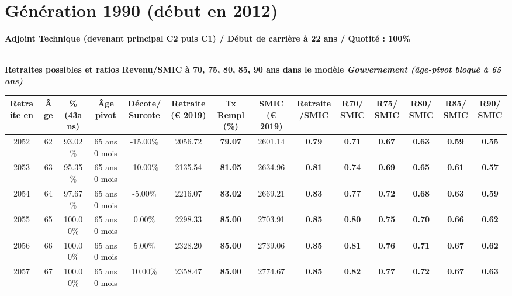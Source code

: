 \newpage 
 
\section{Génération 1990 (début en 2012)\label{AdjTech_100_1990_22_0}} 
 
{\bf \noindent Adjoint Technique (devenant principal C2 puis C1) / Début de carrière à 22 ans / Quotité : 100\%}  ~ 

 ~\\{\bf \noindent Retraites possibles et ratios Revenu/SMIC à 70, 75, 80, 85, 90 ans dans le modèle \emph{Gouvernement (âge-pivot bloqué à 65 ans)}}  
 
\begin{adjustbox}{max width=\textwidth} 
\begin{tabular}[htb]{|c|c||c|c|c||c|c||c|c||c|c|c|c|c|} 
\hline 
 Retraite en &  Âge &  \%(43ans) &  Âge pivot &  Décote/Surcote &  Retraite (\euro{} 2019) &  Tx Rempl(\%) &  SMIC (\euro{} 2019) &  Retraite/SMIC &  R70/SMIC &  R75/SMIC &  R80/SMIC &  R85/SMIC &  R90/SMIC \\ 
\hline \hline 
 2052 &  62 &  93.02\% &  65 ans 0 mois &  -15.00\% &  2056.72 &  {\bf 79.07} &  2601.14 &  {\bf {\color{red} 0.79}} &  {\bf {\color{red} 0.71}} &  {\bf {\color{red} 0.67}} &  {\bf {\color{red} 0.63}} &  {\bf {\color{red} 0.59}} &  {\bf {\color{red} 0.55}} \\ 
\hline 
 2053 &  63 &  95.35\% &  65 ans 0 mois &  -10.00\% &  2135.54 &  {\bf 81.05} &  2634.96 &  {\bf {\color{red} 0.81}} &  {\bf {\color{red} 0.74}} &  {\bf {\color{red} 0.69}} &  {\bf {\color{red} 0.65}} &  {\bf {\color{red} 0.61}} &  {\bf {\color{red} 0.57}} \\ 
\hline 
 2054 &  64 &  97.67\% &  65 ans 0 mois &  -5.00\% &  2216.07 &  {\bf 83.02} &  2669.21 &  {\bf {\color{red} 0.83}} &  {\bf {\color{red} 0.77}} &  {\bf {\color{red} 0.72}} &  {\bf {\color{red} 0.68}} &  {\bf {\color{red} 0.63}} &  {\bf {\color{red} 0.59}} \\ 
\hline 
 2055 &  65 &  100.00\% &  65 ans 0 mois &  0.00\% &  2298.33 &  {\bf 85.00} &  2703.91 &  {\bf {\color{red} 0.85}} &  {\bf {\color{red} 0.80}} &  {\bf {\color{red} 0.75}} &  {\bf {\color{red} 0.70}} &  {\bf {\color{red} 0.66}} &  {\bf {\color{red} 0.62}} \\ 
\hline 
 2056 &  66 &  100.00\% &  65 ans 0 mois &  5.00\% &  2328.20 &  {\bf 85.00} &  2739.06 &  {\bf {\color{red} 0.85}} &  {\bf {\color{red} 0.81}} &  {\bf {\color{red} 0.76}} &  {\bf {\color{red} 0.71}} &  {\bf {\color{red} 0.67}} &  {\bf {\color{red} 0.62}} \\ 
\hline 
 2057 &  67 &  100.00\% &  65 ans 0 mois &  10.00\% &  2358.47 &  {\bf 85.00} &  2774.67 &  {\bf {\color{red} 0.85}} &  {\bf {\color{red} 0.82}} &  {\bf {\color{red} 0.77}} &  {\bf {\color{red} 0.72}} &  {\bf {\color{red} 0.67}} &  {\bf {\color{red} 0.63}} \\ 
\hline 
\hline 
\end{tabular} 
\end{adjustbox} 
 
